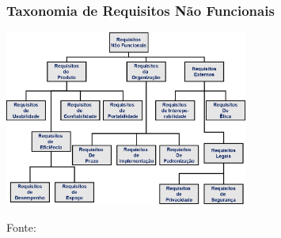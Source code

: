 \documentclass[aspectratio=169]{beamer}
\begin{document}
\begin{frame}
\frametitle{Taxonomia de Requisitos Não Funcionais}

    \centering
    \includegraphics[width=0.6\textwidth]{imagens/NonFunReq.png}

Fonte: \citet{sommerville:software:2015}
   
\end{frame}
\end{document}
